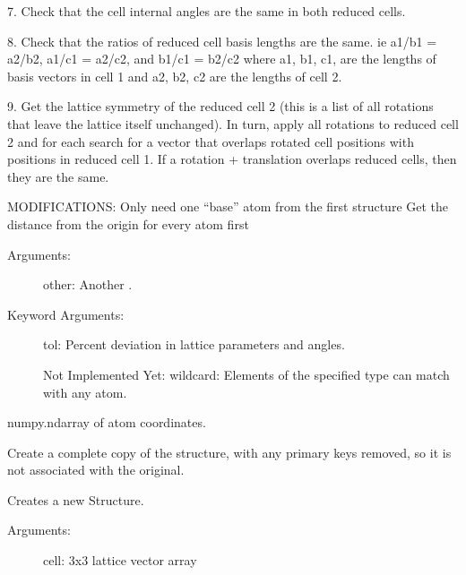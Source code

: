 \documentclass[letterpaper,10pt,english]{sphinxmanual}
\begin{document}
\begin{fulllineitems}
\begin{fulllineitems}
7. Check that the cell internal angles are the same in both reduced
cells.

8. Check that the ratios of reduced cell basis lengths are the same. ie
a1/b1 = a2/b2, a1/c1 = a2/c2, and b1/c1 = b2/c2 where a1, b1, c1, are
the lengths of basis vectors in cell 1 and a2, b2, c2 are the lengths
of cell 2.

9. Get the lattice symmetry of the reduced cell 2 (this is a list of
all rotations that leave the lattice itself unchanged). In turn, apply
all rotations to reduced cell 2 and for each search for a vector that
overlaps rotated cell positions with positions in reduced cell 1. If a
rotation + translation overlaps reduced cells, then they are the same.

MODIFICATIONS:
Only need one ``base'' atom from the first structure
Get the distance from the origin for every atom first
\begin{description}
\item[{Arguments:}] \leavevmode
other: Another .

\item[{Keyword Arguments:}] \leavevmode
tol: Percent deviation in lattice parameters and angles.

Not Implemented Yet:
wildcard: Elements of the specified type can match with any atom.

\end{description}

\end{fulllineitems}


\begin{fulllineitems}
\label{models:qmpy.Structure.coords}
numpy.ndarray of atom coordinates.

\end{fulllineitems}


\begin{fulllineitems}
\label{models:qmpy.Structure.copy}
Create a complete copy of the structure, with any primary keys
removed, so it is not associated with the original.

\end{fulllineitems}


\begin{fulllineitems}
\label{models:qmpy.Structure.create}
Creates a new Structure.
\begin{description}
\item[{Arguments:}] \leavevmode
cell: 3x3 lattice vector array


\end{description}
\end{fulllineitems}
\end{fulllineitems}
\end{document}
